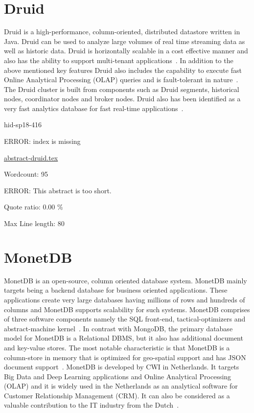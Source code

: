 \section{Druid}

Druid is a high-performance, column-oriented, distributed datastore written in
Java. Druid can be used to analyze large volumes of real time streaming data as
well as historic data. Druid is horizontally scalable in a cost effective manner
and also has the ability to support multi-tenant
applications~\cite{hid-sp18-416-www-druid-wikipedia}. In addition to the above
mentioned key features Druid also includes the capability to execute fast Online
Analytical Processing (OLAP) queries and is fault-tolerant in
nature~\cite{hid-sp18-416-www-about-druid}. The Druid cluster is built from
components such as Druid segments, historical nodes, coordinator nodes and
broker nodes.  Druid also has been identified as a very fast analytics database
for fast real-time
applications~\cite{hid-sp18-416-www-fast-dataanalytics-druid-blog}.


\begin{IU}

hid-sp18-416

ERROR: index is missing

\href{https://github.com/cloudmesh-community/hid-sp18-416/blob/master//technology/abstract-druid.tex}{abstract-druid.tex}

 

Wordcount: 95

ERROR: This abstract is too short.


Quote ratio: 0.00 \%
 
Max Line length: 80
\end{IU}

\section{MonetDB}

MonetDB is an open-source, column oriented database system. MonetDB
mainly targets being a backend database for business oriented
applications. These applications create very large databases having
millions of rows and hundreds of columns and MonetDB supports
scalability for such systems. MonetDB comprises of three software
components namely the SQL front-end, tactical-optimizers and
abstract-machine kernel~\cite{hid-sp18-416-www-monetdb-features}. In
contrast with MongoDB, the primary database model for MonetDB is a
Relational DBMS, but it also has additional document and key-value
stores. The most notable characteristic is that MonetDB is a
column-store in memory that is optimized for geo-spatial support and
has JSON document
support~\cite{hid-sp18-416-www-monetdb-mongodb-comparison}. MonetDB is
developed by CWI in Netherlands. It targets Big Data and Deep Learning
applications and Online Analytical Processing (OLAP) and it is widely
used in the Netherlands as an analytical software for Customer
Relationship Management (CRM). It can also be considered as a valuable
contribution to the IT industry from the
Dutch~\cite{hid-sp18-416-www-monetdb-dutch}.


